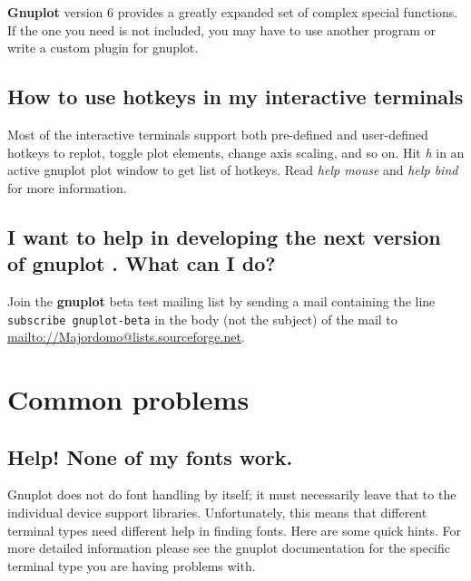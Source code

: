 \documentclass[letter,11pt]{article}
\def\mailto#1{{\small\href{mailto://#1}{\url{mailto://#1}}}}
\newcommand{\mailto}[1]%
            {\htmladdnormallink{\latex{\url{<#1>}}\html{\textit{#1}}}%
                {mailto:#1}%
            }
\newcommand{\gnuplot}{\textbf{gnuplot }}
\newcommand{\Gnuplot}{\textbf{Gnuplot }}
\begin{document}
{\Gnuplot version 6 provides a greatly expanded set of complex special functions.
If the one you need is not included, you may have to use another program or write
a custom plugin for gnuplot.


\subsection{How to use hotkeys in my interactive terminals}

Most of the interactive terminals support both pre-defined and user-defined
hotkeys to replot, toggle plot elements, change axis scaling, and so on.
Hit \textit{h} in an active gnuplot plot window to get list of hotkeys.
Read \textit{help mouse} and \textit{help bind} for more information.


\subsection{I want to help in developing the next version of \gnuplot.
What can I do?}

Join the \gnuplot beta test mailing list by sending a mail
containing the line
\verb+subscribe gnuplot-beta+
in the body (not the subject) of the mail to
\mailto{Majordomo@lists.sourceforge.net}.


\section{Common problems}


\subsection{Help! None of my fonts work.}

Gnuplot does not do font handling by itself; it must necessarily leave
that to the individual device support libraries. Unfortunately, this
means that different terminal types need different help in finding
fonts. Here are some quick hints. For more detailed information please
see the gnuplot documentation for the specific terminal type you are
having problems with.

}
\end{document}
